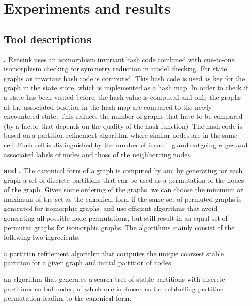 \section{Experiments and results}
\label{section-experiments}

\subsection{Tool descriptions}

\noindent\textbf{\GROOVE.}
Rensink \cite{rensink2009:isomorphism,rensink2007:isomorphism} uses an
isomorphism invariant hash code combined with one-to-one isomorphism checking
for symmetry reduction in model checking. For state graphs an invariant hash
code is computed. This hash code is used as key for the graph in the state
store, which is implemented as a hash map. In order to check if a state has been
visited before, the hash value is computed and only the graphs at the associated
position in the hash map are compared to the newly encountered state. This
reduces the number of graphs that have to be compared (by a factor that depends
on the quality of the hash function). The hash code is based on a partition
refinement algorithm where similar nodes are in the same cell. Each cell is
distinguished by the number of incoming and outgoing edges and associated labels
of nodes and those of the neighbouring nodes.

\medskip\noindent\textbf{\NAUTY and \BLISS.}
The canonical form of a graph is computed by \NAUTY and \BLISS by generating for
each graph a set of discrete partitions that can be used as a permutation of the
nodes of the graph. Given some ordering of the graphs, we can choose the minimum
or maximum of the set as the canonical form if the same set of permuted graphs
is generated for isomorphic graphs. \NAUTY and \BLISS use efficient algorithms
that avoid generating all possible node permutations, but still result in an
equal set of permuted graphs for isomorphic graphs. The algorithms mainly
consist of the following two ingredients:
\begin{inparaenum}
\item a partition refinement algorithm that computes the unique coarsest stable
partition for a given graph and initial partition of nodes;
\item an algorithm that generates a search tree of stable partitions with
discrete partitions as leaf nodes, of which one is chosen as the relabelling
partition permutation leading to the canonical form.
\end{inparaenum}

